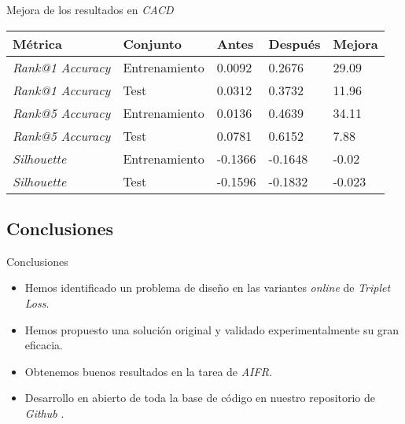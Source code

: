 \begin{frame}{Mejora de los resultados en \textit{CACD}}

	\begin{table}
		\centering
		\begin{tabular}{|l|l|l|l|l|}
			\hline
			Métrica                  & Conjunto      & Antes   & Después & Mejora \\
			\hline
			\textit{Rank@1 Accuracy} & Entrenamiento & 0.0092  & 0.2676  & 29.09  \\
			\textit{Rank@1 Accuracy} & Test          & 0.0312  & 0.3732  & 11.96  \\
			\textit{Rank@5 Accuracy} & Entrenamiento & 0.0136  & 0.4639  & 34.11  \\
			\textit{Rank@5 Accuracy} & Test          & 0.0781  & 0.6152  & 7.88   \\
			\textit{Silhouette}      & Entrenamiento & -0.1366 & -0.1648 & -0.02  \\
			\textit{Silhouette}      & Test          & -0.1596 & -0.1832 & -0.023 \\
			\hline
		\end{tabular}
		\label{table:comparaciones_cacd_resultados}
	\end{table}


\end{frame}

\subsection{Conclusiones}
\begin{frame}{Conclusiones}

	\begin{itemize}
		\item Hemos identificado un problema de diseño en las variantes \textit{online} de \textit{Triplet Loss}.
		\item Hemos propuesto una solución original y validado experimentalmente su gran eficacia.
		\item Obtenemos buenos resultados en la tarea de \textit{AIFR}.
		\item Desarrollo en abierto de toda la base de código en nuestro repositorio de \textit{Github} \cite{informatica:repogithub}.
	\end{itemize}

\end{frame}
